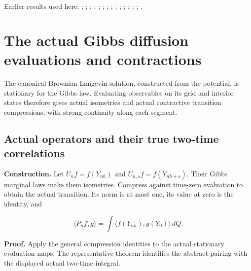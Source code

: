 \documentclass[11pt,a4paper]{report}
\begin{document}
Earlier results used here: \cite[Section~3.17.2]{LangevinLean2026ULASC}; \cite[Section~3.19.1]{LangevinLean2026ULASC}; \cite[Section~3.22.19]{LangevinLean2026ULASC}; \cite[Section~3.22.23]{LangevinLean2026ULASC}; \cite[Section~3.23.9]{LangevinLean2026ULASC}; \cite[Section~3.26.3]{LangevinLean2026ULASC}; \cite[Section~3.32.5]{LangevinLean2026ULASC}; \cite[Section~3.36.7]{LangevinLean2026ULASC}; \cite[Section~3.45.1]{LangevinLean2026ULASC}; \cite[Section~3.45.3]{LangevinLean2026ULASC}; \cite[Section~3.45.4]{LangevinLean2026ULASC}; \cite[Section~3.8.17]{LangevinLean2026ULASC}; \cite[Section~3.8.19]{LangevinLean2026ULASC}; \cite[Section~3.8.20]{LangevinLean2026ULASC}; \cite[Section~3.8.22]{LangevinLean2026ULASC}.
\section{\texorpdfstring{The actual Gibbs diffusion evaluations and contractions}{The actual Gibbs diffusion evaluations and contractions}}
\label{proof-module-WassersteinMixing-SemigroupActual-lean}


The canonical Brownian Langevin solution, constructed from the potential, is stationary for the Gibbs law. Evaluating observables on its grid and interior states therefore gives actual isometries and actual contractive transition compressions, with strong continuity along each segment.

\subsection{\texorpdfstring{Actual operators and their true two-time correlations}{Actual operators and their true two-time correlations}}
\label{report-step-WassersteinMixing-SemigroupActual-lean-1}


\textbf{Construction.} Let \(U_nf=f(Y_{nh})\) and \(U_{n,s}f=f(Y_{nh+s})\). Their Gibbs marginal laws make them isometries. Compress against time-zero evaluation to obtain the actual transition. Its norm is at most one, its value at zero is the identity, and

\[\langle P_nf,g\rangle=\int\langle f(Y_{nh}),g(Y_0)\rangle\,dQ.\]

\textbf{Proof.} Apply the general compression identities to the actual stationary evaluation maps. The representative theorem identifies the abstract pairing with the displayed actual two-time integral.
\end{document}
